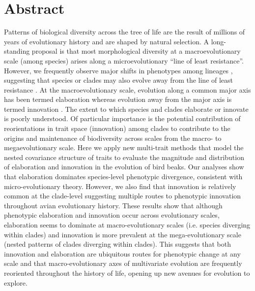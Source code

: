 \documentclass[12pt,letterpaper]{article}
\begin{document}
\section{Abstract}

Patterns of biological diversity across the tree of life are the result of millions of years of evolutionary history and are shaped by natural selection.
A long-standing proposal is that most morphological diversity at a macroevolutionary scale (among species) arises along a microevolutionary ``line of least resistance''.
However, we frequently observe major shifts in phenotypes among lineages \cite{venditti2011multiple, pagel2022general}, suggesting that species or clades may also evolve away from the line of least resistance \cite{renaud2006conserved}.
At the macroevolutionary scale, evolution along a common major axis has been termed elaboration whereas evolution away from the major axis is termed innovation \cite{endler2005animal}. 
The extent to which species and clades elaborate or innovate is poorly understood. Of particular importance is the potential contribution of reorientations in trait space (innovation) among clades to contribute to the origins and maintenance of biodiversity across scales from the macro- to megaevolutionary scale.
Here we apply new multi-trait methods that model the nested covariance structure of traits to evaluate the magnitude and distribution of elaboration and innovation in the evolution of bird beaks.
Our analyses show that elaboration dominates species-level phenotypic divergence, consistent with micro-evolutionary theory.
However, we also find that innovation is relatively common at the clade-level suggesting multiple routes to phenotypic innovation throughout avian evolutionary history.
These results show that although phenotypic elaboration and innovation occur across evolutionary scales, elaboration seems to dominate at macro-evolutionary scales (i.e. species diverging within clades) and innovation is more prevalent at the mega-evolutionary scale (nested patterns of clades diverging within clades).
This suggests that both innovation and elaboration are ubiquitous routes for phenotypic change at any scale and that macro-evolutionary axes of multivariate evolution are frequently reoriented throughout the history of life, opening up new avenues for evolution to explore.

\end{document}
